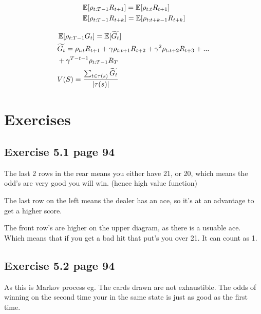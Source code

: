 \begin{equation}
\begin{split}
& \operatorname{\mathbb{E}}[\rho_{t:T-1}R_{t+1}] = \operatorname{\mathbb{E}}[\rho_{t:t}R_{t+1}] \\
& \operatorname{\mathbb{E}}[\rho_{t:T-1}R_{t+k}] = \operatorname{\mathbb{E}}[\rho_{t:t+k-1}R_{t+k}] \\
\end{split}
\label{eq:reduced sampling ratio term}
\end{equation}

\begin{equation}
\begin{split}
& \operatorname{\mathbb{E}}[\rho_{t:T-1}G_t] = \operatorname{\mathbb{E}}[\widetilde{G_t}] \\
& \widetilde{G_t} = \rho_{t:t}R_{t+1} + \gamma \rho_{t:t+1}R_{t+2} + \gamma^2 \rho_{t:t+2}R_{t+3} + ... \\
& + \gamma^{T-t-1}\rho_{t:T-1}R_T \\
& V(S) = \frac{\sum_{t\in\tau(s)}\widetilde{G_t}}{|\tau(s)|}\\
\label{eq:per-decision importance sampling value function}
\end{split}
\end{equation}




\section{Exercises}

\subsection{Exercise 5.1 page 94}
The last 2 rows in the rear means you either have 21, or 20, which means the odd's are very good you will win. (hence high value function)

The last row on the left means the dealer has an ace, so it's at an advantage to get a higher score.

The front row's are higher on the upper diagram, as there is a usuable ace. Which means that if you get a bad hit that put's you over 21. It can count as 1.

\subsection{Exercise 5.2 page 94}
As this is Markov process eg. The cards drawn are not exhaustible. The odds of winning on the second time your in the same state is just as good as the first time.

